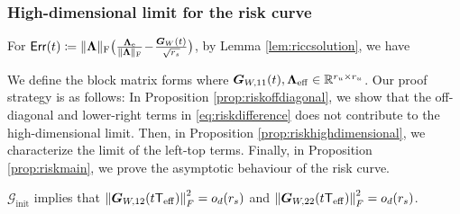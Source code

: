 \subsubsection{High-dimensional limit for the risk curve}
For  $\mathsf{Err}(t) \coloneqq  \normL \big( \tfrac{\Lae }{\normL}  \! - \! \tfrac{\bs{G}_{W}(t)}{\sqrt{\rs}} \big)$,  by Lemma \ref{lem:riccsolution},  we have

 We define the block matrix forms
where   $\bs{G}_{W,11}(t) ,  \La_{\mathrm{eff}}  \in \R^{\ru \times \ru }$. 
Our proof strategy is as follows: In Proposition \ref{prop:riskoffdiagonal},    we show that the off-diagonal and lower-right terms in \eqref{eq:riskdifference} does not contribute to the high-dimensional limit. Then,  in  Proposition \ref{prop:riskhighdimensional},  we characterize the limit of the left-top terms.  Finally, in Proposition \ref{prop:riskmain}, we prove the  asymptotic behaviour of the risk curve.


\begin{proposition}
\label{prop:riskoffdiagonal}
$\mathcal{G}_{\text{init}}$ implies that  $\norm*{ \bs{G}_{W,12}(t  \mathsf{T}_{\mathrm{eff}} ) }_F^2  = o_d(\rs)$   and  $\norm*{ \bs{G}_{W,22}(t \mathsf{T}_{\mathrm{eff}} ) }_F^2 = o_d(\rs)$.
\end{proposition}

